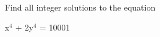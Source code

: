 Find all integer solutions to the equation

\begin{center}

x$^{4}$ + 2y$^{4}$ = 10001

\end{center}

